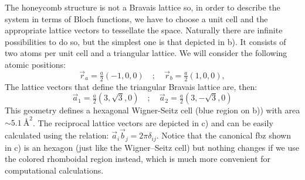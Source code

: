 The honeycomb structure is not a Bravais lattice so, in order to describe the system in terms of Bloch functions, we have to choose a unit cell and the appropriate lattice vectors to tessellate the space.
Naturally there are infinite possibilities to do so, but the simplest one is that depicted in b).
It consists of two atoms per unit cell and a triangular lattice. We will consider the following atomic positions:
\begin{equation}
\vec{r}_a = \tfrac{a}{2}(-1,0,0) \quad;\quad
\vec{r}_b = \tfrac{a}{2}(1,0,0),
\label{at_pos}
\end{equation}
The lattice vectors that define the triangular Bravais lattice are, then:
\begin{equation}
\vec{a}_1 = \tfrac{a}{2}\left(3,\sqrt{3},0\right) \quad;\quad
\vec{a}_2 = \tfrac{a}{2}\left(3,-\sqrt{3},0\right)
\label{latt_vec}
\end{equation}
This geometry defines a hexagonal Wigner-Seitz cell (blue region on b)) with area $\sim\SI{5.1}{\angstrom\squared}$. The reciprocal lattice vectors are depicted in c) and can be easily calculated using the relation\cite{Ashcroft1976}: $\vec{a}_i\vec{b}_j=2\pi\delta_{ij}$. Notice that the canonical \ac{fbz} shown in c) is an hexagon (just like the Wigner–Seitz cell) but nothing changes if we use the colored rhomboidal region instead, which is much more convenient for computational calculations.
\medbreak


